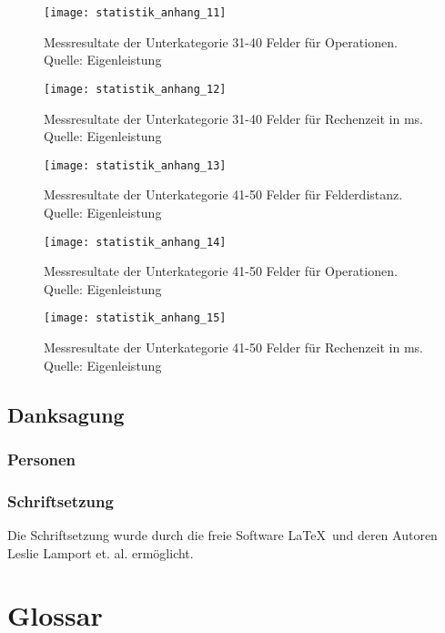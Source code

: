 \begin{figure}[H]
  \centering
  \texttt{[image: statistik\_anhang\_11]}
  \caption[Messresultate der Unterkategorie 31-40 Felder für Operationen.]{Messresultate der Unterkategorie 31-40 Felder für Operationen. Quelle: Eigenleistung}
\end{figure}
\begin{figure}[H]
  \centering
  \texttt{[image: statistik\_anhang\_12]}
  \caption[Messresultate der Unterkategorie 31-40 Felder für Rechenzeit in ms.]{Messresultate der Unterkategorie 31-40 Felder für Rechenzeit in ms. Quelle: Eigenleistung}
\end{figure}
\begin{figure}[H]
  \centering
  \texttt{[image: statistik\_anhang\_13]}
  \caption[Messresultate der Unterkategorie 41-50 Felder für Felderdistanz.]{Messresultate der Unterkategorie 41-50 Felder für Felderdistanz. Quelle: Eigenleistung}
\end{figure}
\begin{figure}[H]
  \centering
  \texttt{[image: statistik\_anhang\_14]}
  \caption[Messresultate der Unterkategorie 41-50 Felder für Operationen.]{Messresultate der Unterkategorie 41-50 Felder für Operationen. Quelle: Eigenleistung}
\end{figure}
\begin{figure}[H]
  \centering
  \texttt{[image: statistik\_anhang\_15]}
  \caption[Messresultate der Unterkategorie 41-50 Felder für Rechenzeit in ms.]{Messresultate der Unterkategorie 41-50 Felder für Rechenzeit in ms. Quelle: Eigenleistung}
\end{figure}

\section{Danksagung}
\subsection{Personen}

\subsection{Schriftsetzung}
Die Schriftsetzung wurde durch die freie Software \LaTeX\  und deren Autoren Leslie Lamport et. al. ermöglicht.

\chapter{Glossar}
